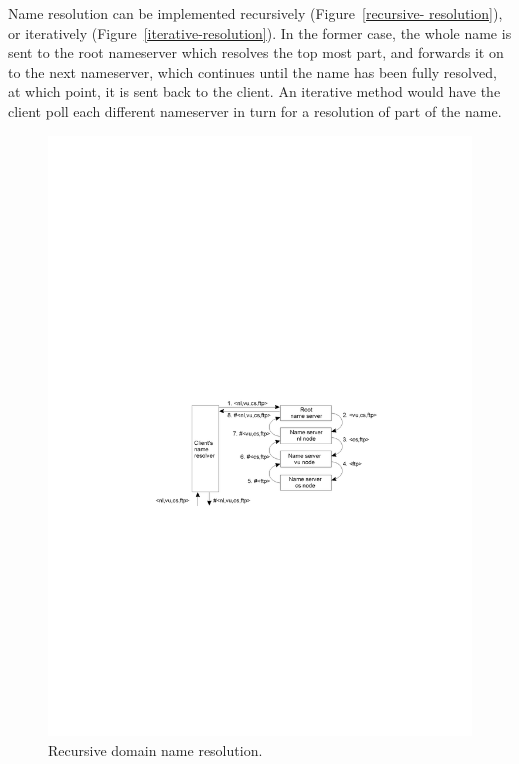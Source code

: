 Name resolution can be implemented recursively (Figure~\ref{recursive-
resolution}), or iteratively (Figure~\ref{iterative-resolution}). In the former
case, the whole name is sent to the root nameserver which resolves the top most
part, and forwards it on to the next nameserver, which continues until the name
has been fully resolved, at which point, it is sent back to the client. An
iterative method would have the client poll each different nameserver in turn
for a resolution of part of the name.

\begin{figure}[H]
  \centering
  \includegraphics[width=\textwidth]{images/recursive-resolution}
  \caption{Recursive domain name resolution.}
  \label{recursive-resolution}
\end{figure}

